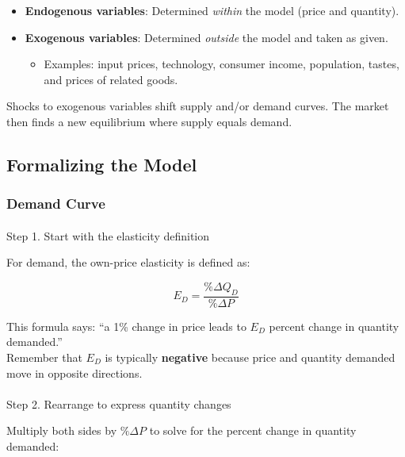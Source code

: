 \documentclass[
  letterpaper,
  DIV=11,
  numbers=noendperiod]{scrartcl}
\makeatletter
\let\oldparagraph\paragraph
\renewcommand{\paragraph}{
    \@ifstar
      \xxxParagraphStar
      \xxxParagraphNoStar
  }
\newcommand{\xxxParagraphStar}[1]{\oldparagraph*{#1}\mbox{}}
\newcommand{\xxxParagraphNoStar}[1]{\oldparagraph{#1}\mbox{}}
\providecommand{\tightlist}{%
  \setlength{\itemsep}{0pt}\setlength{\parskip}{0pt}}
\makeatother
\begin{document}
\begin{itemize}
\tightlist
\item
  \textbf{Endogenous variables}: Determined \emph{within} the model
  (price and quantity).\\
\item
  \textbf{Exogenous variables}: Determined \emph{outside} the model and
  taken as given.

  \begin{itemize}
  \tightlist
  \item
    Examples: input prices, technology, consumer income, population,
    tastes, and prices of related goods.
  \end{itemize}
\end{itemize}

Shocks to exogenous variables shift supply and/or demand curves. The
market then finds a new equilibrium where supply equals demand.

\subsection{Formalizing the Model}\label{formalizing-the-model}

\subsubsection{Demand Curve}\label{demand-curve}

\paragraph{Step 1. Start with the elasticity
definition}\label{step-1.-start-with-the-elasticity-definition}

For demand, the own-price elasticity is defined as:

\[
E_D = \frac{\% \Delta Q_D}{\% \Delta P}
\]

This formula says: ``a 1\% change in price leads to \(E_D\) percent
change in quantity demanded.''\\
Remember that \(E_D\) is typically \textbf{negative} because price and
quantity demanded move in opposite directions.

\paragraph{Step 2. Rearrange to express quantity
changes}\label{step-2.-rearrange-to-express-quantity-changes}

Multiply both sides by \(\% \Delta P\) to solve for the percent change
in quantity demanded:
\end{document}
